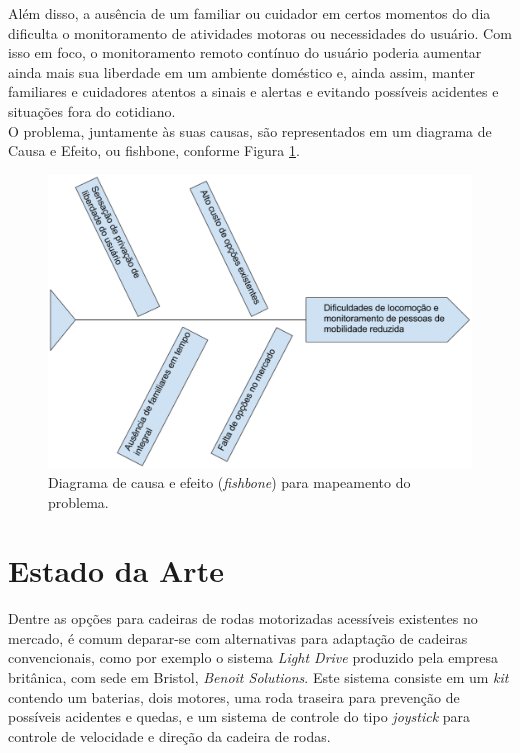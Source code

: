 Além disso, a ausência de um familiar ou cuidador em certos momentos 
do dia 
dificulta o monitoramento de atividades motoras ou necessidades 
do usuário. 
Com isso em foco, o monitoramento remoto contínuo do usuário 
poderia 
aumentar ainda mais sua liberdade em um ambiente doméstico e, ainda 
assim, 
manter familiares e cuidadores atentos a sinais e alertas e evitando 
possíveis 
acidentes e situações fora do cotidiano.\\
	
O problema, juntamente às suas causas, são representados em um diagrama 
de Causa e Efeito, ou fishbone, conforme Figura \ref{fishbone}.
	
\begin{figure}[h]
    \centering
    \label{fishbone}
    \includegraphics[scale=0.5]{figuras/fishbone.eps}
    \caption{Diagrama de causa e efeito (\textit{fishbone}) para mapeamento do problema.}
\end{figure}


\section{Estado da Arte}

Dentre as opções para cadeiras de rodas motorizadas acessíveis existentes no mercado,
é comum deparar-se com alternativas para adaptação de cadeiras convencionais,
como por exemplo o sistema \textit{Light Drive} produzido pela empresa britânica, 
com sede em Bristol, \textit{Benoit Solutions}. Este sistema consiste em um \textit{kit}
contendo um baterias, dois motores, uma roda traseira para prevenção de possíveis
acidentes e quedas, e um sistema de controle do tipo \textit{joystick}
para controle de velocidade e direção da cadeira de rodas.\\

